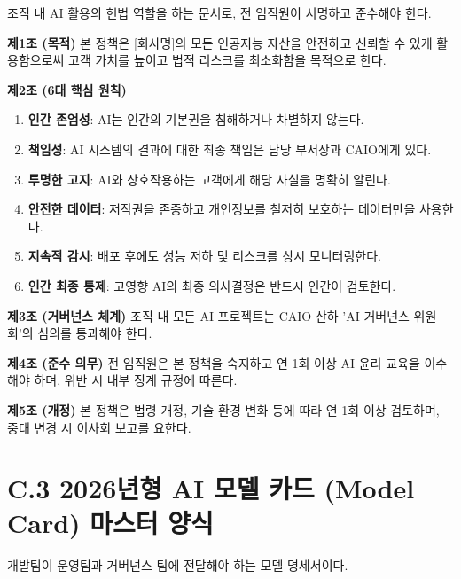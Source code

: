 조직 내 AI 활용의 헌법 역할을 하는 문서로, 전 임직원이 서명하고 준수해야 한다.

\begin{tcolorbox}[colback=gray!5, title={[Template C.2] 전사 AI 활용 및 거버넌스 정책}]
\textbf{제1조 (목적)}
본 정책은 [회사명]의 모든 인공지능 자산을 안전하고 신뢰할 수 있게 활용함으로써 고객 가치를 높이고 법적 리스크를 최소화함을 목적으로 한다.

\textbf{제2조 (6대 핵심 원칙)}
\begin{enumerate}
    \item \textbf{인간 존엄성}: AI는 인간의 기본권을 침해하거나 차별하지 않는다.
    \item \textbf{책임성}: AI 시스템의 결과에 대한 최종 책임은 담당 부서장과 CAIO에게 있다.
    \item \textbf{투명한 고지}: AI와 상호작용하는 고객에게 해당 사실을 명확히 알린다.
    \item \textbf{안전한 데이터}: 저작권을 존중하고 개인정보를 철저히 보호하는 데이터만을 사용한다.
    \item \textbf{지속적 감시}: 배포 후에도 성능 저하 및 리스크를 상시 모니터링한다.
    \item \textbf{인간 최종 통제}: 고영향 AI의 최종 의사결정은 반드시 인간이 검토한다.
\end{enumerate}

\textbf{제3조 (거버넌스 체계)}
조직 내 모든 AI 프로젝트는 CAIO 산하 'AI 거버넌스 위원회'의 심의를 통과해야 한다.

\textbf{제4조 (준수 의무)}
전 임직원은 본 정책을 숙지하고 연 1회 이상 AI 윤리 교육을 이수해야 하며, 위반 시 내부 징계 규정에 따른다.

\textbf{제5조 (개정)}
본 정책은 법령 개정, 기술 환경 변화 등에 따라 연 1회 이상 검토하며, 중대 변경 시 이사회 보고를 요한다.
\end{tcolorbox}

\section*{C.3 2026년형 AI 모델 카드 (Model Card) 마스터 양식}

개발팀이 운영팀과 거버넌스 팀에 전달해야 하는 모델 명세서이다.

